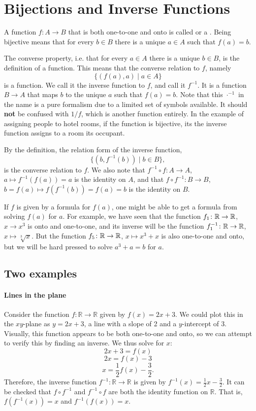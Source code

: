 \section{Bijections and Inverse Functions}

A function $f\colon A\to B$ that is both one-to-one and onto is called
 or a . Being bijective means that for every $b\in
B$ there is a unique $a\in A$ such that $f(a)=b$.

The converse property, i.e. that for every
$a\in A$ there is a unique $b\in B$, is the definition of a function. This means that
the converse relation to $f$, namely
\[
\{(f(a),a)\mid a\in A\}
\]
is a function. We call it the inverse function to $f$, and call it $f^{-1}$. It is a
function $B\to A$ that maps $b$ to the unique $a$ such that $f(a)=b$.
Note that
this $\cdot^{-1}$ in the name is a pure formalism due to a limited set of symbols available. It
should \textbf{not} be confused with $1/f$, which is another function entirely.
In the example of assigning people to hotel rooms, if the function is bijective, its the
inverse function assigns to a room its occupant.

By the definition, the relation form of the inverse function,
\[
\{(b,f^{-1}(b))\mid b\in B\},
\]
is the converse relation to $f$. We also
note that $f^{-1}\circ f\colon A\to A$, $a\mapsto f^{-1}(f(a))=a$ is the identity
on $A$, and that $f\circ f^{-1}\colon B\to B$, $b=f(a)\mapsto f(f^{-1}(b))=f(a)=b$ is
the identity on $B$.
\medskip

If $f$ is given by a formula for $f(a)$, one might be able to get a formula  from
solving $f(a)$ for $a$. For example, we have seen that the function $f_1\colon{\mathbb R}\to{\mathbb R}$,
$x\to x^3$ is onto and one-to-one, and its inverse will be the function
$f_1^{-1}\colon{\mathbb R}\to{\mathbb R}$, $x\mapsto\sqrt[3]{x}$. But the function $f_5\colon{\mathbb R}\to{\mathbb R}$,
$x\mapsto x^3+x$ is also one-to-one and  onto, but we will be hard pressed to solve
$a^3+a=b$ for $a$.

\subsection{Two examples}

\paragraph{Lines in the plane}
Consider the function $f \colon \mathbb{R} \to \mathbb{R}$ given by $f(x) = 2x+3$.
We could plot this in the $xy$-plane as $y=2x+3$, a line with a slope of 2 and a $y$-intercept of 3.
Visually, this function appears to be both one-to-one and onto, so we can attempt to verify this by finding an inverse.
We thus solve for $x$:
\[
2x+3 = f(x)
\]
\[
2x = f(x)-3
\]
\[
x = \frac{1}{2}f(x) - \frac{3}{2}.
\]
Therefore, the inverse function $f^{-1} \colon \mathbb{R} \to \mathbb{R}$ is given by $f^{-1}(x) = \frac{1}{2}x - \frac{3}{2}$.
It can be checked that $f \circ f^{-1}$ and $f^{-1} \circ f$ are both the identity function on $\mathbb{R}$.  That is, $f(f^{-1}(x)) = x$ and $f^{-1}(f(x))=x$.

